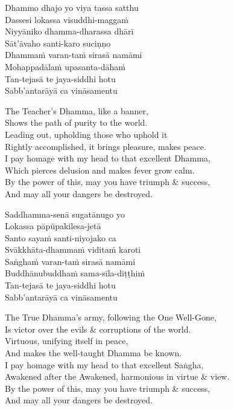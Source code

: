 Dhammo dhajo yo viya tassa satthu\\
Dassesi lokassa visuddhi-maggaṁ\\
Niyyāniko dhamma-dharassa dhārī\\
Sāt'āvaho santi-karo suciṇṇo\\
Dhammaṁ varan-taṁ sirasā namāmi\\
Mohappadālaṁ upasanta-dāhaṁ\\
Tan-tejasā te jaya-siddhi hotu\\
Sabb'antarāyā ca vināsamentu

\begin{english-verses}
  The Teacher's Dhamma, like a banner,\\
  Shows the path of purity to the world.\\
  Leading out, upholding those who uphold it\\
  Rightly accomplished, it brings pleasure, makes peace.\\
  I pay homage with my head to that excellent Dhamma,\\
  Which pierces delusion and makes fever grow calm.\\
  By the power of this, may you have triumph \& success,\\
  And may all your dangers be destroyed.
\end{english-verses}

Saddhamma-senā sugatānugo yo\\
Lokassa pāpūpakilesa-jetā\\
Santo sayaṁ santi-niyojako ca\\
Svākkhāta-dhammaṁ viditaṁ karoti\\
Saṅghaṁ varan-taṁ sirasā namāmi\\
Buddhānubuddhaṁ sama-sīla-diṭṭhiṁ\\
Tan-tejasā te jaya-siddhi hotu\\
Sabb'antarāyā ca vināsamentu

\begin{english-verses}
  The True Dhamma's army, following the One Well-Gone,\\
  Is victor over the evils \& corruptions of the world.\\
  Virtuous, unifying itself in peace,\\
  And makes the well-taught Dhamma be known.\\
  I pay homage with my head to that excellent Saṅgha,\\
  Awakened after the Awakened, harmonious in virtue \& view.\\
  By the power of this, may you have triumph \& success,\\
  And may all your dangers be destroyed.
\end{english-verses}

